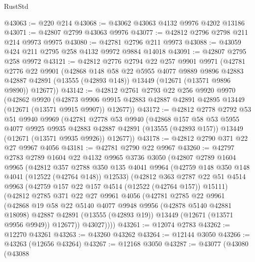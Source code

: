 \begin{lexlean}{RustStd}
\begin{coremodule}
@43063 := @220 @214
@43068 := @43062 @43063 @4132 @9976 @4202 @13186
@43071 := @42807 @2799 @43063 @9976
@43077 := @42812 @2796 @2798 @211 @214 @9973 @9975
@43080 := @42781 @2796 @211 @9973
@43088 := @43059 @424 @211 @2795 @258 @4132 @9972 @9884 @14018
@43091 := @42807 @2795 @258 @9972
@43121 := @42812
    @2776
    @2794
    @22
    @257
    @9901
    @9971
    (@42781
      @2776
      @22
      @9901
      (@42868
        @148
        @58
        @22
        @5955
        @4077
        @9889
        @9896
        @42883
        @42887
        @42891
        (@13555 (@42893 @148))
        @13449
        (@12671 (@13571 @9896 @9890))
        @12677))
@43142 := @42812
    @2761
    @2793
    @22
    @256
    @9920
    @9970
    (@42862
      @9920
      (@42873 @9906 @9915 @42883 @42887 @42891 @42895 @13449 (@12671 (@13571 @9915 @9907)) @12677))
@43172 := @42812
    @2778
    @2792
    @53
    @51
    @9940
    @9969
    (@42781
      @2778
      @53
      @9940
      (@42868
        @157
        @58
        @53
        @5955
        @4077
        @9925
        @9935
        @42883
        @42887
        @42891
        (@13555 (@42893 @157))
        @13449
        (@12671 (@13571 @9935 @9926))
        @12677))
@43178 := @42812 @2790 @371 @22 @27 @9967 @4056
@43181 := @42781 @2790 @22 @9967
@43260 := @42797
    @2783
    @2789
    @1604
    @22
    @4132
    @9965
    @3736
    @3050
    (@42807
      @2789
      @1604
      @9965
      (@42812
        @357
        @2788
        @350
        @135
        @4041
        @9964
        (@42759 @148 @350 @148 @4041 (@12522 (@42764 @148)) @12533)
        (@42812
          @363
          @2787
          @22
          @51
          @4514
          @9963
          (@42759 @157 @22 @157 @4514 (@12522 (@42764 @157)) @15111)
          (@42812
            @2785
            @371
            @22
            @27
            @9961
            @4056
            (@42781
              @2785
              @22
              @9961
              (@42868
                @19
                @58
                @22
                @5140
                @4077
                @9948
                @9956
                (@42878 @5140 @42881 @18098)
                @42887
                @42891
                (@13555 (@42893 @19))
                @13449
                (@12671 (@13571 @9956 @9949))
                @12677))
            @43027))))
@43261 := @12074 @2783
@43262 := @12270 @43261
@43263 := @43260 @43262
@43264 := @12144 @3050
@43266 := @43263 (@12656 @43264)
@43267 := @12168 @3050
@43287 := @43077
    (@43080
      (@43088

\end{coremodule}
\end{lexlean}
